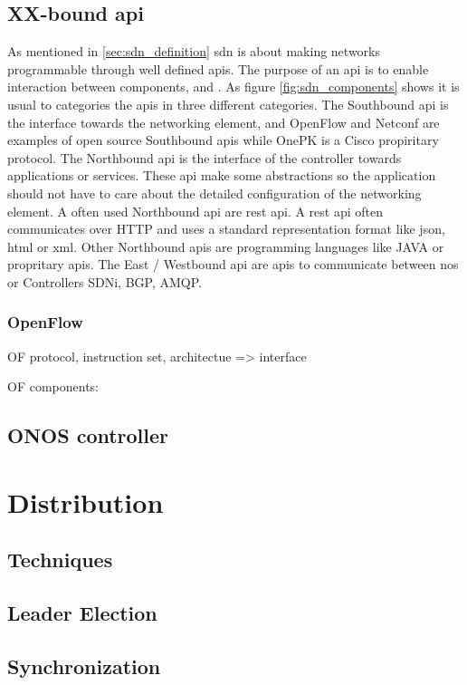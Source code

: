 \subsection{XX-bound \gls{api}}
As mentioned in \ref{sec:sdn_definition} \gls{sdn} is about making networks programmable through well defined \gls{api}s. The purpose of an \gls{api} is to enable interaction between components, and . As figure \ref{fig:sdn_components} shows it is usual to categories the \gls{api}s in three different categories. The Southbound \gls{api} is the interface towards the networking element, and OpenFlow and Netconf are examples of open source Southbound \gls{api}s while OnePK is a Cisco propiritary protocol. The Northbound \gls{api} is the interface of the controller towards applications or services. These \gls{api} make some abstractions so the application should not have to care about the detailed configuration of the networking element. A often used Northbound \gls{api} are \gls{rest} \gls{api}. A \gls{rest} \gls{api} often communicates over HTTP and uses a standard representation format like \gls{json}, \gls{html} or \gls{xml}. Other Northbound \gls{api}s are programming languages like JAVA or propritary \gls{api}s. The East / Westbound \gls{api} are \gls{api}s to communicate between \gls{nos} or Controllers SDNi, BGP, AMQP.


\subsubsection{OpenFlow}
OF protocol, instruction set, architectue => interface\cite{sdn_Anatomy_of_OpenFlow} 

OF components:

\subsection{ONOS controller} 

\section{Distribution}
\subsection{Techniques}
\subsection{Leader Election}
\subsection{Synchronization}

